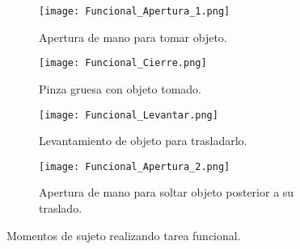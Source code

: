 \begin{figure}[htbp]
	\centering
	\begin{subfigure}[htbp]{0.45\textwidth}
		\texttt{[image: Funcional\_Apertura\_1.png]}
		\caption{Apertura de mano para tomar objeto.}
		\label{Figura: Fun_A_1}
	\end{subfigure}
	\begin{subfigure}[htbp]{0.45\textwidth}
		\texttt{[image: Funcional\_Cierre.png]}
		\caption{Pinza gruesa con objeto tomado.}
		\label{Figura: Fun_C}
	\end{subfigure}
	\newline
	\begin{subfigure}[htbp]{0.45\textwidth}
		\texttt{[image: Funcional\_Levantar.png]}
		\caption{Levantamiento de objeto para trasladarlo.}
		\label{Figura: Fun_L}
	\end{subfigure}
	\begin{subfigure}[htbp]{0.45\textwidth}
		\texttt{[image: Funcional\_Apertura\_2.png]}
		\caption{Apertura de mano para soltar objeto posterior a su traslado.}
		\label{Figura: Fun_A_2}
	\end{subfigure}
	\caption{Momentos de sujeto realizando tarea funcional.}
	\label{Figura: TareaFuncional}
\end{figure}